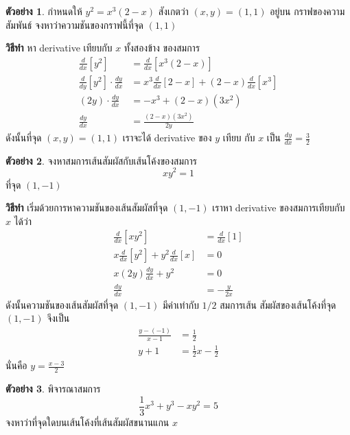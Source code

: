 \documentclass[
]{book}
\theoremstyle{definition}
\theoremstyle{definition}
\newtheorem{example}{ตัวอย่าง}[chapter]
\theoremstyle{definition}
\theoremstyle{definition}
\theoremstyle{remark}
\begin{document}
\begin{example}
กำหนดให้ \(y^2 = x^3(2-x)\) สังเกตว่า \((x,y) = (1,1)\) อยู่บน กราฟของความสัมพันธ์
จงหาว่าความชันของกราฟนี้ที่จุด \((1,1)\)
\end{example}

\textbf{วิธีทำ} หา derivative เทียบกับ \(x\) ทั้งสองข้าง ของสมการ \begin{equation}   \begin{aligned}
    \frac{d}{dx}[y^2] &= \frac{d}{dx}[x^3(2-x)] \\
    \frac{d}{dy}[y^2] \cdot \frac{dy}{dx} &= x^3\frac{d}{dx}[2-x] + (2-x)\frac{d}{dx}[x^3] \\
    (2y) \cdot \frac{dy}{dx} &= -x^3 + (2-x)(3x^2) \\
    \frac{dy}{dx} &= \frac{(2-x)(3x^2)}{2y}
  \end{aligned} \end{equation} ดังนั้นที่จุด \((x,y) = (1,1)\) เราจะได้ derivative ของ \(y\) เทียบ
กับ \(x\) เป็น \(\displaystyle \frac{dy}{dx} = \frac{3}{2}\)

\begin{example}
จงหาสมการเส้นสัมผัสกับเส้นโค้งของสมการ \[xy^2 = 1\] ที่จุด \((1,-1)\)
\end{example}

\textbf{วิธีทำ} เริ่มด้วยการหาความชันของเส้นสัมผัสที่จุด \((1,-1)\) เราหา derivative
ของสมการเทียบกับ \(x\) ได้ว่า \begin{equation}   \begin{aligned}
    \frac{d}{dx}[xy^2] &= \frac{d}{dx}[1] \\
    x\frac{d}{dx}[y^2] + y^2\frac{d}{dx}[x] &= 0 \\
    x(2y)\frac{dy}{dx} + y^2 &= 0 \\
    \frac{dy}{dx} &= -\frac{y}{2x}
  \end{aligned} \end{equation} ดังนั้นความชันของเส้นสัมผัสที่จุด \((1,-1)\) มีค่าเท่ากับ \(1/2\) สมการเส้น
สัมผัสของเส้นโค้งที่จุด \((1,-1)\) จึงเป็น \begin{equation}   \begin{aligned}
    \frac{y-(-1)}{x-1} &= \frac{1}{2} \\
    y+1 &= \frac{1}{2}x -\frac{1}{2}
  \end{aligned} \end{equation} นั่นคือ \(\displaystyle y=\frac{x-3}{2}\)

\begin{example}
พิจารณาสมการ \[\frac{1}{3}x^3+y^3-xy^2 = 5\]
จงหาว่าที่จุดใดบนเส้นโค้งที่เส้นสัมผัสขนานแกน \(x\)
\end{example}
\end{document}
